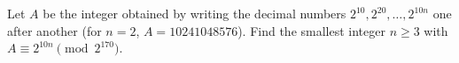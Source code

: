 Let $A$ be the integer obtained by writing the decimal numbers $2^{10},2^{20},\dots,2^{10n}$ one after another (for $n=2$, $A=10241048576$). Find the smallest integer $n\ge3$ with $A\equiv2^{10n}\pmod{2^{170}}$.
